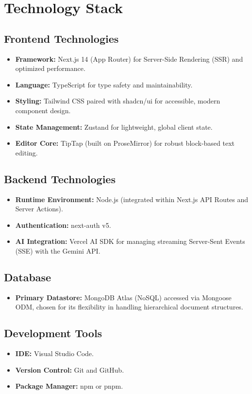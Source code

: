 \documentclass[12pt, a4paper]{article}
\begin{document}
\section{Technology Stack}

\subsection{Frontend Technologies}
\begin{itemize}[leftmargin=2em]
    \item \textbf{Framework:} Next.js 14 (App Router) for Server-Side Rendering (SSR) and optimized performance.
    \item \textbf{Language:} TypeScript for type safety and maintainability.
    \item \textbf{Styling:} Tailwind CSS paired with shadcn/ui for accessible, modern component design.
    \item \textbf{State Management:} Zustand for lightweight, global client state.
    \item \textbf{Editor Core:} TipTap (built on ProseMirror) for robust block-based text editing.
\end{itemize}

\subsection{Backend Technologies}
\begin{itemize}[leftmargin=2em]
    \item \textbf{Runtime Environment:} Node.js (integrated within Next.js API Routes and Server Actions).
    \item \textbf{Authentication:} next-auth v5.
    \item \textbf{AI Integration:} Vercel AI SDK for managing streaming Server-Sent Events (SSE) with the Gemini API.
\end{itemize}

\subsection{Database}
\begin{itemize}[leftmargin=2em]
    \item \textbf{Primary Datastore:} MongoDB Atlas (NoSQL) accessed via Mongoose ODM, chosen for its flexibility in handling hierarchical document structures.
\end{itemize}

\subsection{Development Tools}
\begin{itemize}[leftmargin=2em]
    \item \textbf{IDE:} Visual Studio Code.
    \item \textbf{Version Control:} Git and GitHub.
    \item \textbf{Package Manager:} npm or pnpm.
\end{itemize}
\end{document}
